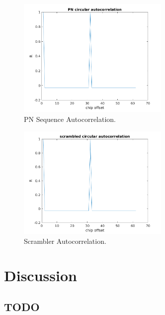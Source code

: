 \documentclass{article}
\begin{document}
\begin{figure}[h]
  \begin{center}
    \includegraphics[width=0.65\textwidth]{img/pn_corr.png}
    \caption{PN Sequence Autocorrelation.}
  \end{center}
\end{figure}
\begin{figure}[h]
  \begin{center}
    \includegraphics[width=0.65\textwidth]{img/sc_corr.png}
    \caption{Scrambler Autocorrelation.}
  \end{center}
\end{figure}



\section{Discussion}

\subsection{TODO}
\end{document}
